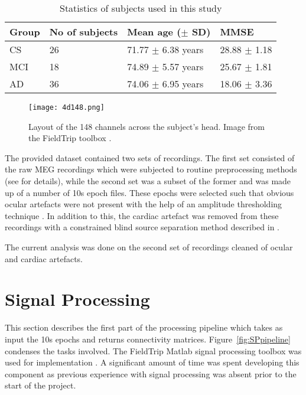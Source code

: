 	\begin{table}
		\centering
	    \begin{tabular}{llll}
	    \hline
	    Group                 & No of subjects & Mean age (\(\pm\) SD)   		 & MMSE         \\ \hline
	    CS 					  & 26             & 71.77 \(\pm\) 6.38 years                    & 28.88 \(\pm\) 1.18 \\
	    MCI                   & 18             & 74.89 \(\pm\) 5.57 years                    & 25.67 \(\pm\) 1.81 \\
	    AD                    & 36             & 74.06 \(\pm\) 6.95 years                    & 18.06 \(\pm\) 3.36   \\
	    \end{tabular}
	    \caption{Statistics of subjects used in this study}
	    \label{tab:dataset}
	\end{table}

	\begin{figure}
	    \centering
	    \texttt{[image: 4d148.png]}
	    \caption{Layout of the 148 channels across the subject's head. Image from the FieldTrip toolbox \autocite{Oostenveld2011}.}
	    \label{fig:4d148}
	\end{figure}

	The provided dataset contained two sets of recordings. The first set consisted of the raw \ac{MEG} recordings which were subjected to routine preprocessing methods (see \textcite{Escudero2011a} for details), while the second set was a subset of the former and was made up of a number of 10s epoch files. These epochs were selected such that obvious ocular artefacts were not present with the help of an amplitude thresholding technique \autocite{Hornero2008}. In addition to this, the cardiac artefact was removed from these recordings with a constrained blind source separation method described in \textcite{Escudero2011b}.

	The current analysis was done on the second set of recordings cleaned of ocular and cardiac artefacts. 

	
	\section{Signal Processing} 
	
	This section describes the first part of the processing pipeline which takes as input the 10s epochs and returns connectivity matrices. Figure~\ref{fig:SPpipeline} condenses the tasks involved. The FieldTrip Matlab signal processing toolbox was used for implementation \autocite{Oostenveld2011}. A significant amount of time was spent developing this component as previous experience with signal processing was absent prior to the start of the project. 
	
